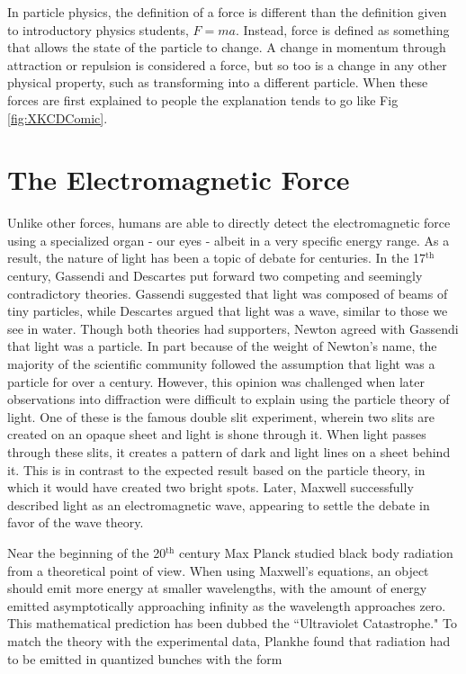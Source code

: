 In particle physics, the definition of a force is different than the definition given to introductory physics students, $F=ma$. Instead, force is defined as something that allows the state of the particle to change. A change in momentum through attraction or repulsion is considered a force, but so too is a change in any other physical property, such as transforming into a different particle. When these forces are first explained to people the explanation tends to go like Fig \ref{fig:XKCDComic}. 


\section{The Electromagnetic Force}
Unlike other forces, humans are able to directly detect the electromagnetic force using a specialized organ - our eyes - albeit in a very specific energy range. As a result, the nature of light has been a topic of debate for centuries. In the 17$^\text{th}$ century, Gassendi and Descartes put forward two competing and seemingly contradictory theories. Gassendi suggested that light was composed of beams of tiny particles, while Descartes argued that light was a wave, similar to those we see in water. Though both theories had supporters, Newton agreed with Gassendi that light was a particle. In part because of the weight of Newton's name, the majority of the scientific community followed the assumption that light was a particle for over a century. However, this opinion was challenged when later observations into diffraction were difficult to explain using the particle theory of light. One of these is the famous double slit experiment, wherein two slits are created on an opaque sheet and light is shone through it. When light passes through these slits, it creates a pattern of dark and light lines on a sheet behind it. This is in contrast to the expected result based on the particle theory, in which it would have created two bright spots. Later, Maxwell successfully described light as an electromagnetic wave, appearing to settle the debate in favor of the wave theory\cite{LightHistory}.\par
Near the beginning of the 20$^\text{th}$ century Max Planck studied black body radiation from a theoretical point of view. When using Maxwell's equations, an object should emit more energy at smaller wavelengths, with the amount of energy emitted asymptotically approaching infinity as the wavelength approaches zero.  This mathematical prediction has been dubbed the ``Ultraviolet Catastrophe." To match the theory with the experimental data, Plankhe found that radiation had to be emitted in quantized bunches with the form 
